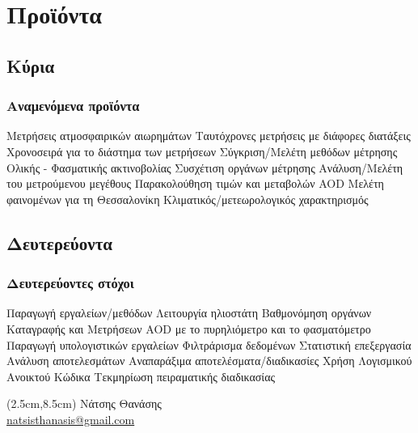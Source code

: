 \documentclass[noamsthm,12pt]{beamer}
\begin{document}
\section{Προϊόντα}

\subsection{Κύρια}

\begin{frame}
	\frametitle{Αναμενόμενα προϊόντα}
		
	\begin{outline}
		\1 Μετρήσεις ατμοσφαιρικών αιωρημάτων
			\2 Ταυτόχρονες μετρήσεις με διάφορες διατάξεις
			\2 Χρονοσειρά για το διάστημα των μετρήσεων
		\1 Σύγκριση/Μελέτη μεθόδων μέτρησης
			\2 Ολικής - Φασματικής ακτινοβολίας
			\2 Συσχέτιση οργάνων μέτρησης
		\1 Ανάλυση/Μελέτη του μετρούμενου μεγέθους
			\2 Παρακολούθηση τιμών και μεταβολών AOD
			\2 Μελέτη φαινομένων για τη Θεσσαλονίκη
			\2 Κλιματικός/μετεωρολογικός χαρακτηρισμός
		
	\end{outline}

		
\end{frame}


\subsection{Δευτερεύοντα}

\begin{frame}
	\frametitle{Δευτερεύοντες στόχοι}
	\begin{outline}
		\1 Παραγωγή εργαλείων/μεθόδων 
			\2[] Λειτουργία ηλιοστάτη
			\2[] Βαθμονόμηση οργάνων
			\2[] Καταγραφής και Μετρήσεων AOD με το πυρηλιόμετρο και το φασματόμετρο
		\1 Παραγωγή υπολογιστικών εργαλείων
			\2[] Φιλτράρισμα δεδομένων
			\2[] Στατιστική επεξεργασία
			\2[] Ανάλυση αποτελεσμάτων
		\1 Αναπαράξιμα αποτελέσματα/διαδικασίες
			\2[] Χρήση Λογισμικού Ανοικτού Κώδικα
			\2[] Τεκμηρίωση πειραματικής διαδικασίας
	\end{outline}
\end{frame}















\begin{frame}[c]
\phantom{1}  \vfill \phantom{1}  \hfill \phantom{1}    \phantom{1}  \hfill \phantom{1}  \vfill \phantom{1} 

\begin{textblock*}{13cm}(2.5cm,8.5cm)
\scriptsize Νάτσης Θανάσης\\
\href{mailto:natsisthanasis@gmail.com}{\url{natsisthanasis@gmail.com}}
\end{textblock*}
\end{frame}
\end{document}

